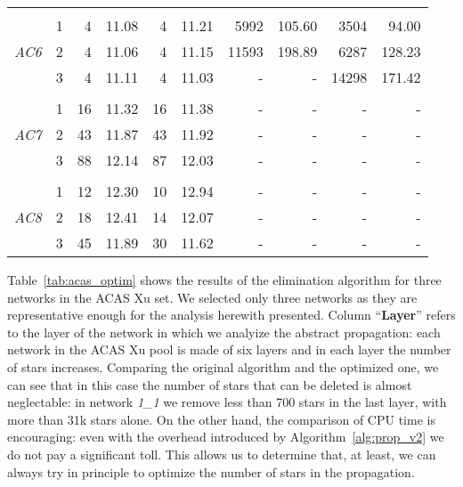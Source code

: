 \begin{table}[t!]
{\begin{tabular}{c c rr rr rr rr}
			& & & & & & & & & \\
			\multirow{3}{*}{\textit{AC6}}
			& 1 & 4 & 11.08 & 4 & 11.21 & 5992 & 105.60 & 3504 & 94.00 \\ 
			& 2 & 4 & 11.06 & 4 & 11.15 & 11593 & 198.89 & 6287 & 128.23 \\ 
			& 3 & 4 & 11.11 & 4 & 11.03 & - & - & 14298 & 171.42 \\ 
			& & & & & & & & & \\
			\multirow{3}{*}{\textit{AC7}}
			& 1 & 16 & 11.32 & 16 & 11.38 & - & - & - & - \\ 
			& 2 & 43 & 11.87 & 43 & 11.92 & - & - & - & - \\ 
			& 3 & 88 & 12.14 & 87 & 12.03 & - & - & - & - \\ 
			& & & & & & & & & \\
			\multirow{3}{*}{\textit{AC8}}
			& 1 & 12 & 12.30 & 10 & 12.94 & - & - & - & - \\ 
			& 2 & 18 & 12.41 & 14 & 12.07 & - & - & - & - \\ 
			& 3 & 45 & 11.89 & 30 & 11.62 & - & - & - & - \\ 
			\bottomrule 
	\end{tabular}}
\end{table}

Table~\ref{tab:acas_optim} shows the results of the elimination algorithm for three
networks in the ACAS Xu set. We selected only three networks as they are representative
enough for the analysis herewith presented. Column ``\textbf{Layer}'' refers to the
layer of the network in which we analyize the abstract propagation: each network in the
ACAS Xu pool is made of six layers and in each layer the number of stars increases.
Comparing the original algorithm and the optimized one, we can see that in this case
the number of stars that can be deleted is almost neglectable: in network \textit{1\_1}
we remove less than 700 stars in the last layer, with more than 31k stars alone.
On the other hand, the comparison of CPU time is encouraging: even with the overhead
introduced by Algorithm~\ref{alg:prop_v2} we do not pay a significant toll. This
allows us to determine that, at least, we can always try in principle to optimize the
number of stars in the propagation.

